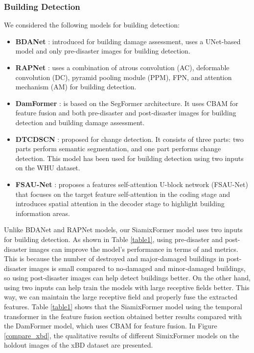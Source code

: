 \documentclass{article}
\begin{document}
\subsubsection{Building Detection}
We considered the following models for building detection:
\begin{itemize}
	\item \textbf{BDANet} \cite{shen2021bdanet}: introduced for building damage assessment, uses a UNet-based model and only pre-disaster images for building detection.
	\item \textbf{RAPNet} \cite{tian2021multiscale}: uses a combination of atrous convolution (AC), deformable convolution (DC), pyramid pooling module (PPM), FPN, and attention mechanism (AM) for building detection.                                                                                                                                                        
	\item \textbf{DamFormer} \cite{chen2022dual}: is based on the SegFormer architecture. It uses CBAM \cite{woo2018cbam} for feature fusion and both pre-disaster and post-disaster images for building detection and building damage assessment.
	\item \textbf{DTCDSCN} \cite{liu2020building}: proposed for change detection. It consists of three parts: two parts perform semantic segmentation, and one part performs change detection. This model has been used for building detection using two inputs on the WHU dataset.
	\item \textbf{FSAU-Net} \cite{hu2023fsau}: proposes a features self-attention U-block network (FSAU-Net) that focuses on the target feature self-attention in the coding stage and introduces spatial attention in the decoder stage to highlight building information areas.
\end{itemize}

Unlike BDANet and RAPNet models, our SiamixFormer model uses two inputs for building detection. As shown in Table \ref{table1}, using pre-disaster and post-disaster images can improve the model's performance in terms of  and  metrics. This is because the number of destroyed and major-damaged buildings in post-disaster images is small compared to no-damaged and minor-damaged buildings, so using post-disaster images can help detect buildings better. On the other hand, using two inputs can help train the models with large receptive fields better. This way, we can maintain the large receptive field and properly fuse the extracted features. Table \ref{table1} shows that the SiamixFormer model using the temporal transformer in the feature fusion section obtained better results compared with the DamFormer model, which uses CBAM for feature fusion. In Figure \ref{compare_xbd}, the qualitative results of different SimixFormer models on the holdout images of the xBD dataset are presented.
\end{document}

